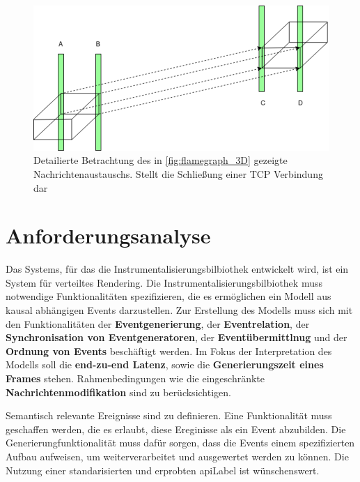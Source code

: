 \begin{figure}[!ht]
	\centering
	\includegraphics[scale=0.5]{img/Problembeschreibung/flamegraph_3D_closing.png}
	\caption[Flammengraph TCP schließung]{Detailierte Betrachtung des in \cref{fig:flamegraph_3D} gezeigte Nachrichtenaustauschs. Stellt die Schließung einer TCP Verbindung dar}
	\label{fig:flamegraph_3D_closing}
\end{figure}

\section{Anforderungsanalyse}
\label{section:Anforderungsanalyse}

Das Systems, für das die Instrumentalisierungsbilbiothek entwickelt wird, ist ein System für verteiltes Rendering. Die Instrumentalisierungsbilbiothek muss notwendige Funktionalitäten spezifizieren, die es ermöglichen ein Modell aus kausal abhängigen Events darzustellen. Zur Erstellung des Modells muss sich mit den Funktionalitäten der \textbf{Eventgenerierung}, der \textbf{Eventrelation}, der \textbf{Synchronisation von Eventgeneratoren}, der \textbf{Eventübermittlnug} und der \textbf{Ordnung von Events} beschäftigt werden. Im Fokus der Interpretation des Modells soll die \textbf{end-zu-end Latenz}, sowie die \textbf{Generierungszeit eines Frames} stehen. Rahmenbedingungen wie die eingeschränkte \textbf{Nachrichtenmodifikation} sind zu berücksichtigen.

Semantisch relevante Ereignisse sind zu definieren. Eine Funktionalität muss geschaffen werden, die es erlaubt, diese Ereginisse als ein Event abzubilden. Die Generierungfunktionalität muss dafür sorgen, dass die Events einem spezifizierten Aufbau aufweisen, um weiterverarbeitet und ausgewertet werden zu können. Die Nutzung einer standarisierten und erprobten \gls{apiLabel} ist wünschenswert.
 
